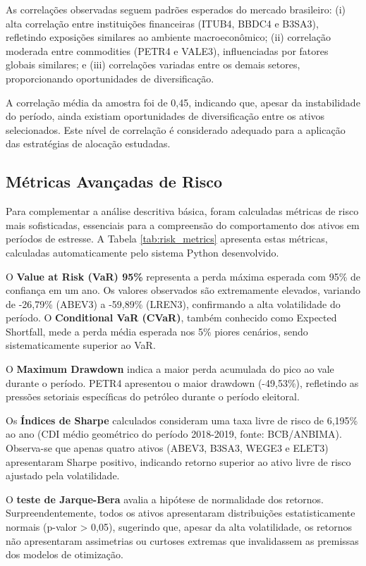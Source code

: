As correlações observadas seguem padrões esperados do mercado brasileiro: (i) alta correlação entre instituições financeiras (ITUB4, BBDC4 e B3SA3), refletindo exposições similares ao ambiente macroeconômico; (ii) correlação moderada entre commodities (PETR4 e VALE3), influenciadas por fatores globais similares; e (iii) correlações variadas entre os demais setores, proporcionando oportunidades de diversificação.

A correlação média da amostra foi de 0,45, indicando que, apesar da instabilidade do período, ainda existiam oportunidades de diversificação entre os ativos selecionados. Este nível de correlação é considerado adequado para a aplicação das estratégias de alocação estudadas.

\subsection{Métricas Avançadas de Risco}

Para complementar a análise descritiva básica, foram calculadas métricas de risco mais sofisticadas, essenciais para a compreensão do comportamento dos ativos em períodos de estresse. A Tabela \ref{tab:risk_metrics} apresenta estas métricas, calculadas automaticamente pelo sistema Python desenvolvido.



O \textbf{Value at Risk (VaR) 95\%} representa a perda máxima esperada com 95\% de confiança em um ano. Os valores observados são extremamente elevados, variando de -26,79\% (ABEV3) a -59,89\% (LREN3), confirmando a alta volatilidade do período. O \textbf{Conditional VaR (CVaR)}, também conhecido como Expected Shortfall, mede a perda média esperada nos 5\% piores cenários, sendo sistematicamente superior ao VaR.

O \textbf{Maximum Drawdown} indica a maior perda acumulada do pico ao vale durante o período. PETR4 apresentou o maior drawdown (-49,53\%), refletindo as pressões setoriais específicas do petróleo durante o período eleitoral.

Os \textbf{Índices de Sharpe} calculados consideram uma taxa livre de risco de 6,195\% ao ano (CDI médio geométrico do período 2018-2019, fonte: BCB/ANBIMA). Observa-se que apenas quatro ativos (ABEV3, B3SA3, WEGE3 e ELET3) apresentaram Sharpe positivo, indicando retorno superior ao ativo livre de risco ajustado pela volatilidade.

O \textbf{teste de Jarque-Bera} avalia a hipótese de normalidade dos retornos. Surpreendentemente, todos os ativos apresentaram distribuições estatisticamente normais (p-valor > 0,05), sugerindo que, apesar da alta volatilidade, os retornos não apresentaram assimetrias ou curtoses extremas que invalidassem as premissas dos modelos de otimização.

